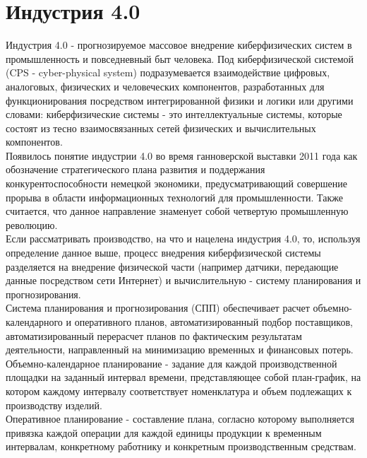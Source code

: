 \section{Индустрия 4.0}
Индустрия 4.0 - прогнозируемое массовое внедрение киберфизических систем в промышленность и повседневный быт человека.
Под киберфизической системой (CPS - cyber-physical system) подразумевается взаимодействие цифровых, аналоговых, физических и человеческих компонентов, разработанных для функционирования посредством интегрированной физики и логики или другими словами: киберфизические системы - это интеллектуальные системы, которые состоят из тесно взаимосвязанных сетей физических и вычислительных компонентов.\cite{nist}\\
\indent Появилось понятие индустрии 4.0 во время ганноверской выставки 2011 года как обозначение стратегического плана развития и поддержания конкурентоспособности немецкой экономики, предусматривающий совершение прорыва в области информационных технологий для промышленности.
Также считается, что данное направление знаменует собой четвертую промышленную революцию.\cite{industry}\\
\indent Если рассматривать производство, на что и нацелена индустрия 4.0, то, используя определение данное выше, процесс внедрения киберфизической системы разделяется на внедрение физической части (например датчики, передающие данные посредством сети Интернет) и вычислительную - систему планирования и прогнозирования.\\
\indent Система планирования и прогнозирования (СПП) обеспечивает расчет объемно-календарного и оперативного планов, автоматизированный подбор поставщиков, автоматизированный перерасчет планов по фактическим результатам деятельности, направленный на минимизацию временных и финансовых потерь.\\
\indent Объемно-календарное планирование - задание для каждой производственной площадки на заданный интервал времени, представляющее собой план-график, на котором каждому интервалу соответствует номенклатура и объем подлежащих к производству изделий.\cite{niokr}\\
\indent Оперативное планирование - составление плана, согласно которому выполняется привязка каждой операции для каждой единицы продукции к временным интервалам, конкретному работнику и конкретным производственным средствам.\cite{niokr}\\
